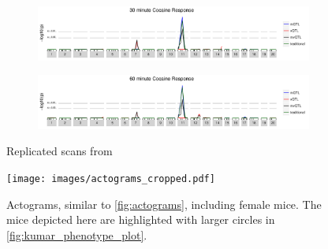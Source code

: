         \begin{figure}
            \begin{subfigure}{\textwidth}
                \includegraphics[width=\textwidth]{images/Kumar_cocaine30_scan.pdf}
            \end{subfigure}
            \begin{subfigure}{\textwidth}
                \includegraphics[width=\textwidth]{images/Kumar_cocaine60_scan.pdf}
            \end{subfigure}
          \caption{Replicated scans from \cite{Kumar2013}}
          \label{fig:replicate_kumar}
        \end{figure}

        \begin{figure}
            \centering
            \texttt{[image: images/actograms\_cropped.pdf]}
            \caption{
                Actograms, similar to \autoref{fig:actograms}, including female mice.
                The mice depicted here are highlighted with larger circles in \autoref{fig:kumar_phenotype_plot}.
            }
            \label{fig:actogram_supp}
        \end{figure}

